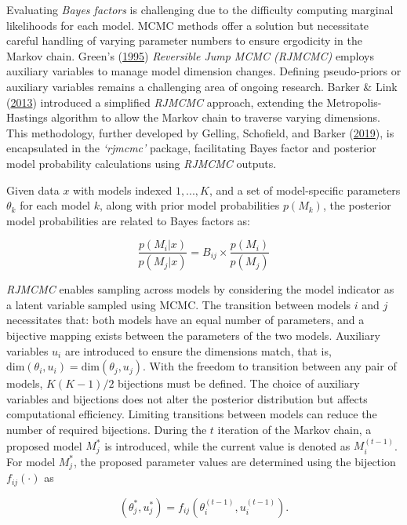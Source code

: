 \documentclass[
  11pt,
]{article}
\begin{document}
Evaluating \emph{Bayes factors} is challenging due to the difficulty
computing marginal likelihoods for each model. MCMC methods offer a
solution but necessitate careful handling of varying parameter numbers
to ensure ergodicity in the Markov chain. Green's
(\protect\hyperlink{ref-Green1995}{1995}) \emph{Reversible Jump MCMC
(RJMCMC)} employs auxiliary variables to manage model dimension changes.
Defining pseudo-priors or auxiliary variables remains a challenging area
of ongoing research. Barker \& Link
(\protect\hyperlink{ref-Barker2013}{2013}) introduced a simplified
\emph{RJMCMC} approach, extending the Metropolis-Hastings algorithm to
allow the Markov chain to traverse varying dimensions. This methodology,
further developed by Gelling, Schofield, and Barker
(\protect\hyperlink{ref-Gelling2019}{2019}), is encapsulated in the
\emph{`rjmcmc'} package, facilitating Bayes factor and posterior model
probability calculations using \emph{RJMCMC} outputs.

Given data \(x\) with models indexed \(1,...,K\), and a set of
model-specific parameters \(\theta_k\) for each model \(k\), along with
prior model probabilities \(p(M_k)\), the posterior model probabilities
are related to Bayes factors as:

\begin{equation}
\frac{p(M_i|x)}{p(M_j|x)} = B_{ij} \times \frac{p(M_i)}{p(M_j)}
\end{equation}

\emph{RJMCMC} enables sampling across models by considering the model
indicator as a latent variable sampled using MCMC. The transition
between models \(i\) and \(j\) necessitates that: both models have an
equal number of parameters, and a bijective mapping exists between the
parameters of the two models. Auxiliary variables \(u_i\) are introduced
to ensure the dimensions match, that is,
\(\text{dim}(\theta_i,u_i) = \text{dim}(\theta_j,u_j)\). With the
freedom to transition between any pair of models, \(K(K-1)/2\)
bijections must be defined. The choice of auxiliary variables and
bijections does not alter the posterior distribution but affects
computational efficiency. Limiting transitions between models can reduce
the number of required bijections. During the \(t\) iteration of the
Markov chain, a proposed model \(M_{j}^*\) is introduced, while the
current value is denoted as \(M_{i}^{(t-1)}\). For model \(M_{j}^*\),
the proposed parameter values are determined using the bijection
\(f_{ij}(\cdot)\) as

\begin{equation}
(\theta_{j}^*, u_{j}^*) = f_{ij}(\theta_{i}^{(t-1)}, u_{i}^{(t-1)}).
\end{equation}
\end{document}
